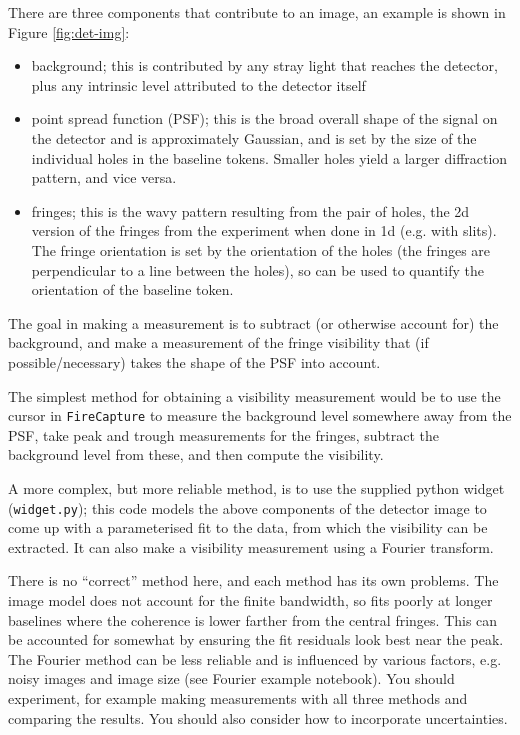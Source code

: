 \documentclass[11pt]{article}
\begin{document}
There are three components that contribute to an image, an example is shown in Figure \ref{fig:det-img}:
\begin{itemize}
    \item background; this is contributed by any stray light that reaches the detector, plus any intrinsic level attributed to the detector itself
    \item point spread function (PSF); this is the broad overall shape of the signal on the detector and is approximately Gaussian, and is set by the size of the individual holes in the baseline tokens. Smaller holes yield a larger diffraction pattern, and vice versa.
    \item fringes; this is the wavy pattern resulting from the pair of holes, the 2d version of the fringes from the experiment when done in 1d (e.g. with slits). The fringe orientation is set by the orientation of the holes (the fringes are perpendicular to a line between the holes), so can be used to quantify the orientation of the baseline token.
\end{itemize}
The goal in making a measurement is to subtract (or otherwise account for) the background, and make a measurement of the fringe visibility that (if possible/necessary) takes the shape of the PSF into account.

The simplest method for obtaining a visibility measurement would be to use the cursor in \texttt{FireCapture} to measure the background level somewhere away from the PSF, take peak and trough measurements for the fringes, subtract the background level from these, and then compute the visibility.

A more complex, but more reliable method, is to use the supplied python widget (\texttt{widget.py}); this code models the above components of the detector image to come up with a parameterised fit to the data, from which the visibility can be extracted. It can also make a visibility measurement using a Fourier transform.

There is no ``correct'' method here, and each method has its own problems. The image model does not account for the finite bandwidth, so fits poorly at longer baselines where the coherence is lower farther from the central fringes. This can be accounted for somewhat by ensuring the fit residuals look best near the peak. The Fourier method can be less reliable and is influenced by various factors, e.g. noisy images and image size (see Fourier example notebook). You should experiment, for example making measurements with all three methods and comparing the results. You should also consider how to incorporate uncertainties.
\end{document}
